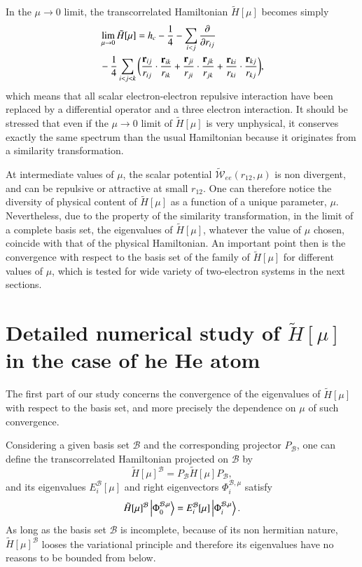 \documentclass[aip,jcp,reprint,noshowkeys,superscriptaddress]{revtex4-1}
\newcommand{\deriv}[3]{\frac{\partial^{#3} #1}{\partial {#2}^{#3}}}
\newcommand{\bri}[1]{{\bf r}_{#1}}
\newcommand{\phimub}[0]{\Phi^{\mathcal{B},\mu}_0}
\newcommand{\phiimub}[0]{\Phi^{\mathcal{B},\mu}_i}
\newcommand{\basis}[0]{\mathcal{B}}
\begin{document}
In the $\mu \rightarrow 0$ limit, the transcorrelated Hamiltonian $\tilde{H}[\mu]$ becomes simply 
\begin{equation}
 \label{eq:htilde_mu_low}
 \begin{aligned}
&\lim_{\mu \rightarrow 0} \tilde{H}[\mu] = h_c - \frac{1}{4} - \sum_{i<j}\deriv{}{r_{ij}}{} \\
 & - \frac{1}{4}\sum_{i<j<k}  \bigg(\frac{\bri{ij} }{ r_{ij}} \cdot \frac{\bri{ik} }{ r_{ik}} + \frac{\bri{ji} }{ r_{ji}} \cdot \frac{\bri{jk}  }{ r_{jk}} + \frac{\bri{ki} }{ r_{ki}} \cdot  \frac{\bri{kj} }{ r_{kj}} \bigg),
 \end{aligned}
\end{equation}
which means that all scalar electron-electron repulsive interaction have been replaced by a differential operator and a three electron interaction. 
It should be stressed that even if the $\mu \rightarrow 0$ limit of $\tilde{H}[\mu]$ is very unphysical, it conserves exactly the same spectrum than the usual Hamiltonian because it originates from a similarity transformation. 

At intermediate values of $\mu$, the scalar potential $\tilde{\mathcal{W}}_{ee}(r_{12},\mu) $ is non divergent, and can be repulsive or attractive at small $r_{12}$. One can therefore notice the diversity of physical content of $\tilde{H}[\mu]$ as a function of a unique parameter, $\mu$. 
Nevertheless, due to the property of the similarity transformation, in the limit of a complete basis set, the eigenvalues of $\tilde{H}[\mu]$, whatever the value of $\mu$ chosen, coincide with that of the physical Hamiltonian. An important point then is the convergence with respect to the basis set of the family of $\tilde{H}[\mu]$ for different values of $\mu$, which is tested for wide variety of two-electron systems in the next sections. 

\section{Detailed numerical study of $\tilde{H}[\mu]$ in the case of he He atom}
\label{sec:total_he}
The first part of our study concerns the convergence of the eigenvalues of $\tilde{H}[\mu]$ with respect to the basis set, and more precisely the dependence on $\mu$ of such convergence. 

Considering a given basis set $\basis$ and the corresponding projector $P_\basis$, one can define the transcorrelated Hamiltonian projected on $\basis$ by
\begin{equation}
 \tilde{H}[\mu]^{\basis} = P_\basis \tilde{H}[\mu] P_\basis,
\end{equation}
and its eigenvalues $E_i^{\basis}[\mu]$ and right eigenvectors $\phiimub$ satisfy 
\begin{equation}
 \tilde{H}[\mu]^{\basis} \ket{\phimub} = E_i^{\basis}[\mu] \ket{\phiimub}. 
\end{equation}
As long as the basis set $\basis$ is incomplete, because of its non hermitian nature, $\tilde{H}[\mu]^{\basis}$ looses the variational principle and therefore its eigenvalues have no reasons to be bounded from below.  
\end{document}
